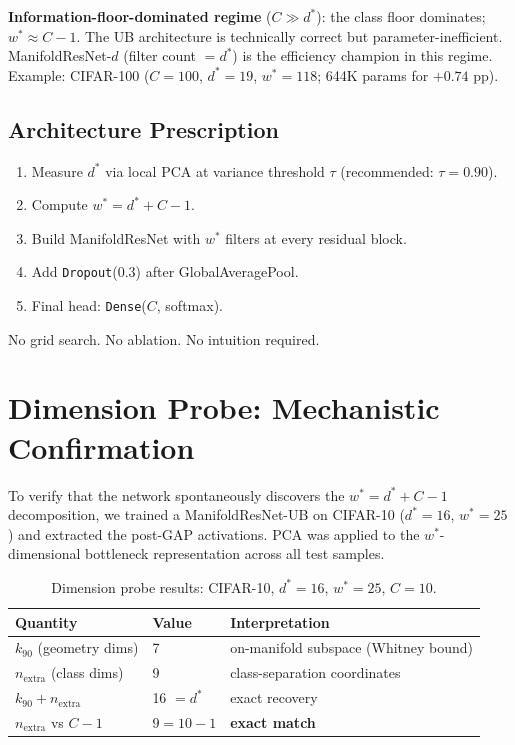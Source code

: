 \documentclass[11pt,letterpaper]{article}
\begin{document}
\textbf{Information-floor-dominated regime} ($C \gg d^*$): the class floor
dominates; $w^* \approx C-1$.  The UB architecture is technically correct
but parameter-inefficient.  ManifoldResNet-$d$ (filter count $= d^*$) is
the efficiency champion in this regime.
Example: CIFAR-100 ($C=100$, $d^*=19$, $w^*=118$; 644K params for $+0.74$ pp).

\subsection{Architecture Prescription}
\label{sec:prescription}

\begin{enumerate}
  \item Measure $d^*$ via local PCA at variance threshold $\tau$ (recommended: $\tau = 0.90$).
  \item Compute $w^* = d^* + C - 1$.
  \item Build ManifoldResNet with $w^*$ filters at every residual block.
  \item Add \texttt{Dropout}(0.3) after GlobalAveragePool.
  \item Final head: \texttt{Dense}($C$, softmax).
\end{enumerate}

No grid search.  No ablation.  No intuition required.

\section{Dimension Probe: Mechanistic Confirmation}
\label{sec:dimprobe}

To verify that the network spontaneously discovers the $w^* = d^* + C - 1$
decomposition, we trained a ManifoldResNet-UB on CIFAR-10 ($d^*=16$, $w^*=25$)
and extracted the post-GAP activations.  PCA was applied to the $w^*$-dimensional
bottleneck representation across all test samples.

\begin{table}[h]
\centering
\caption{Dimension probe results: CIFAR-10, $d^*=16$, $w^*=25$, $C=10$.}
\label{tab:dimprobe}
\begin{tabular}{@{}lll@{}}
\toprule
\textbf{Quantity} & \textbf{Value} & \textbf{Interpretation} \\
\midrule
$k_{90}$ (geometry dims) & 7 & on-manifold subspace (Whitney bound) \\
$n_\text{extra}$ (class dims) & 9 & class-separation coordinates \\
$k_{90} + n_\text{extra}$ & 16 $= d^*$ & exact recovery \\
$n_\text{extra}$ vs $C-1$ & $9 = 10 - 1$ & \textbf{exact match} \\
\bottomrule
\end{tabular}
\end{table}
\end{document}
